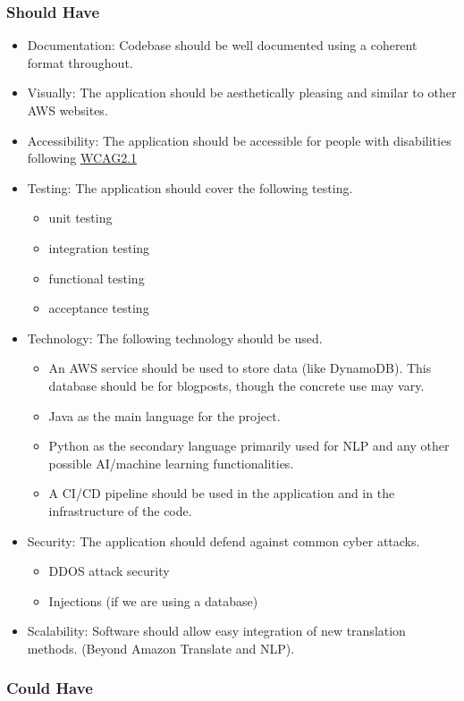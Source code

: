 \subsubsection*{Should Have}
\begin{itemize}
\item Documentation: Codebase should be well documented using a coherent format throughout.
\item Visually: The application should be aesthetically pleasing and similar to other AWS websites.
\item Accessibility: The application should be accessible for people with disabilities following \href{https://www.w3.org/TR/WCAG21/}{WCAG2.1}
\item Testing: The application should cover the following testing.
\begin{itemize}
\item unit testing
\item integration testing
\item functional testing
\item acceptance testing
\end{itemize}
\item Technology: The following technology should be used.
\begin{itemize}
\item An AWS service should be used to store data (like DynamoDB). This database should be for blogposts, though the concrete use may vary.
\item Java as the main language for the project.
\item Python as the secondary language primarily used for NLP and any other possible AI/machine learning functionalities.
\item A CI/CD pipeline should be used in the application and in the infrastructure of the code.
\end{itemize}
\item Security: The application should defend against common cyber attacks.
\begin{itemize}
    \item DDOS attack security
    \item Injections (if we are using a database)
\end{itemize}
\item Scalability: Software should allow easy integration of new translation methods. (Beyond Amazon Translate and NLP).
\end{itemize}

\noindent \subsubsection*{Could Have}


